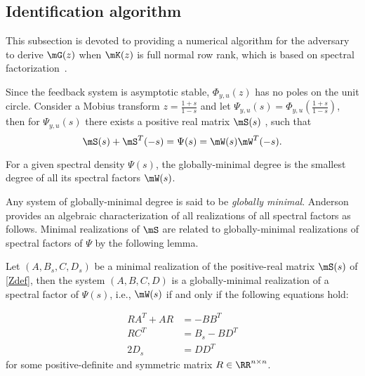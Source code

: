   \subsection{Identification algorithm}\label{sec:identification}
  This subsection is devoted to providing a numerical algorithm for the adversary to derive $\mG(z)$ when $\mK(z)$ is full normal row rank, which is based on spectral factorization~\cite{Sayed:2001yu}. 

  Since the feedback system is asymptotic stable, $\Phi_{y,u}(z)$ has no poles on the unit circle. Consider a Mobius transform $z=\frac{1+s}{1-s}$ and let $\Psi_{y,u}(s)=\Phi_{y,u}\left(\frac{1+s}{1-s}\right)$, then for $\Psi_{y,u}(s)$ there exists a positive real matrix $\mS(s)$ \cite{keith}, such that 
  \begin{equation} \label{Zdef}
    \mS(s) + \mS^T(-s) = \Psi(s)=\mW(s)\mW^T(-s).
  \end{equation}

  \begin{mydef}
    For a given spectral density $\Psi(s)$, the globally-minimal degree is the smallest degree of all its spectral factors $\mW(s)$.
  \end{mydef}

  Any system of globally-minimal degree is said to be \emph{globally minimal}. Anderson \cite{anderson} provides an algebraic characterization of all realizations of all spectral factors as follows. Minimal realizations of $\mS$ are related to globally-minimal realizations of spectral factors of $\Psi$ by the following lemma.

  \begin{lemma}
  \label{lemma:andlem}
    Let $(A,B_s,C,D_s)$ be a minimal realization of the positive-real matrix $\mS(s)$ of \eqref{Zdef}, then the system $(A,B,C,D)$ is a globally-minimal realization of a spectral factor of $\Psi(s)$, i.e., $\mW(s)$ if and only if the following equations hold:

      \begin{align}
	RA^T + AR &= -BB^T\nonumber\\
	RC^T &= B_s - BD^T\nonumber\\
	2D_s &= DD^T
	 \label{eq:and}
      \end{align}
    \noindent for some positive-definite and symmetric matrix ${R\in \RR^{n \times n}}$.
  \end{lemma}


